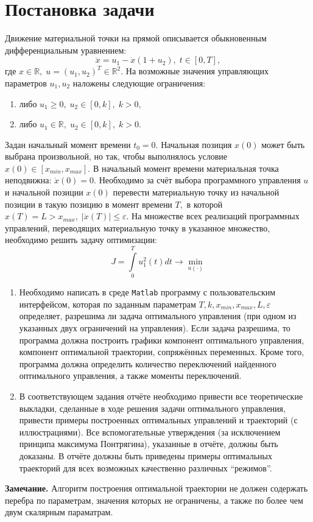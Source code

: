 \documentclass[11pt]{article}
\begin{document}
\section{Постановка задачи}
	Движение материальной точки на прямой описывается обыкновенным дифференциальным уравнением:
	$$
		\ddot{x} = u_1 - \dot{x}(1 + u_2), \; t \in [0, T],
	$$
	где $ x \in \mathbb{R}, \; u = (u_1, u_2)^T \in \mathbb{R}^2. $ На возможные значения управляющих параметров $ u_1, u_2 $ наложены следующие ограничения:
	\begin{enumerate}
		\item либо $ u_1 \geqslant 0, \; u_2 \in [0, k], \; k > 0, $
		\item либо $ u_1 \in \mathbb{R}, \; u_2 \in [0, k], \; k > 0. $
	\end{enumerate}
	Задан начальный момент времени $ t_0 = 0. $ Начальная позиция $ x(0) $ может быть выбрана произвольной, но так, чтобы выполнялось условие $ x(0) \in [x_{min}, x_{max}]. $ В начальный момент времени материальная точка неподвижна: $ \dot{x}(0) = 0. $ Необходимо за счёт выбора программного управления $ u $ и начальной позиции $ x(0) $ перевести материальную точку из начальной позиции в такую позицию в момент времени $ T, $ в которой $ x(T) = L > x_{max}, \; \vert \dot{x}(T) \vert \leqslant \varepsilon. $ На множестве всех реализаций программных управлений, переводящих материальную точку в указанное множество, необходимо решить задачу оптимизации:
	$$
		J = \int \limits_0^T u_1^2(t) dt \rightarrow \min \limits_{ u(\cdot) }
	$$
	\begin{enumerate}
		\item Необходимо написать в среде \texttt{Matlab} программу с пользовательским интерфейсом, которая по заданным параметрам $ T, k, x_{min}, x_{max}, L, \varepsilon $ определяет, разрешима ли задача оптимального управления (при одном из указанных двух ограничений на управления). Если задача разрешима, то программа должна построить графики компонент оптимального управления, компонент оптимальной траектории, сопряжённых переменных. Кроме того, программа должна определить количество переключений найденного оптимального управления, а также моменты переключений.
		\item В соответствующем задания отчёте необходимо привести все теоретические выкладки, сделанные в ходе решения задачи оптимального управления, привести примеры построенных оптимальных управлений и траекторий (с иллюстрациями). Все вспомогательные утверждения (за исключением принципа максимума Понтрягина), указанные в отчёте, должны быть доказаны. В отчёте должны быть приведены примеры оптимальных траекторий для всех возможных качественно различных ``режимов''.
	\end{enumerate}
	\textbf{Замечание.} Алгоритм построения оптимальной траектории не должен содержать перебра по параметрам, значения которых не ограничены, а также по более чем двум скалярным параматрам.
	
\end{document}
